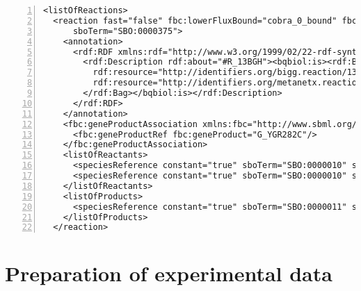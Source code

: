 \begin{lstlisting}[language=SBML,numbers=left,captionpos=t,float=t,caption={First reaction from the merged \SBML file with layout for \iMM},label={lst:MergedSBMLlayoutPart}]
<listOfReactions>
  <reaction fast="false" fbc:lowerFluxBound="cobra_0_bound" fbc:upperFluxBound="cobra_default_ub" id="R_13BGH" metaid="R_13BGH" name="Endo 1 3 beta glucan glucohydrase" reversible="false"
      sboTerm="SBO:0000375">
    <annotation>
      <rdf:RDF xmlns:rdf="http://www.w3.org/1999/02/22-rdf-syntax-ns#" xmlns:bqbiol="http://biomodels.net/biology-qualifiers/">
        <rdf:Description rdf:about="#R_13BGH"><bqbiol:is><rdf:Bag><rdf:li
          rdf:resource="http://identifiers.org/bigg.reaction/13BGH"/><rdf:li
          rdf:resource="http://identifiers.org/metanetx.reaction/MNXR94686"/>
        </rdf:Bag></bqbiol:is></rdf:Description>
      </rdf:RDF>
    </annotation>
    <fbc:geneProductAssociation xmlns:fbc="http://www.sbml.org/sbml/level3/version1/fbc/version2">
      <fbc:geneProductRef fbc:geneProduct="G_YGR282C"/>
    </fbc:geneProductAssociation>
    <listOfReactants>
      <speciesReference constant="true" sboTerm="SBO:0000010" species="M_13BDglcn_c" stoichiometry="1"/>
      <speciesReference constant="true" sboTerm="SBO:0000010" species="M_h2o_c" stoichiometry="1"/>
    </listOfReactants>
    <listOfProducts>
      <speciesReference constant="true" sboTerm="SBO:0000011" species="M_glc__D_c" stoichiometry="1"/>
    </listOfProducts>
  </reaction>
\end{lstlisting}

\section{Preparation of experimental data}

